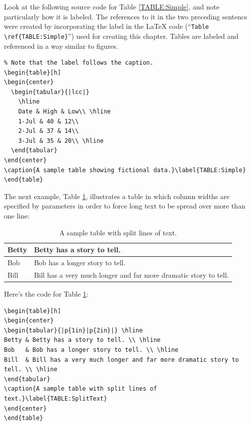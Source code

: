 {Look at the following source code for Table \ref{TABLE:Simple}, and note particularly how it is labeled.
The references to it in the two preceding sentencs were created by incorporating the label in the {\LaTeX} code 
(``\verb+Table \ref{TABLE:Simple}+'') used for creating this chapter.
Tables are labeled and referenced in a way similar to figures.

\begin{verbatim}
% Note that the label follows the caption.
\begin{table}[h]
\begin{center}
  \begin{tabular}{|lcc|}
    \hline
    Date & High & Low\\ \hline
    1-Jul & 40 & 12\\
    2-Jul & 37 & 14\\
    3-Jul & 35 & 20\\ \hline
  \end{tabular}
\end{center}
\caption{A sample table showing fictional data.}\label{TABLE:Simple}
\end{table}
\end{verbatim}

The next example, Table \ref{TABLE:SplitText}, illustrates a table in which column widths are specified by parameters in order to force long text to be spread over more than one line: 

\begin{table}[h]
\begin{center}
\begin{tabular}{|p{1in}|p{2in}|} \hline
Betty & Betty has a story to tell. \\ \hline
Bob   & Bob has a longer story to tell. \\ \hline
Bill  & Bill has a very much longer and far more dramatic story to tell. \\ \hline
\end{tabular}
\caption{A sample table with split lines of text.}\label{TABLE:SplitText}
\end{center}
\end{table}

\noindent Here's the code for Table \ref{TABLE:SplitText}:

\begin{verbatim}
\begin{table}[h]
\begin{center}
\begin{tabular}{|p{1in}|p{2in}|} \hline
Betty & Betty has a story to tell. \\ \hline
Bob   & Bob has a longer story to tell. \\ \hline
Bill  & Bill has a very much longer and far more dramatic story to tell. \\ \hline
\end{tabular}
\caption{A sample table with split lines of text.}\label{TABLE:SplitText}
\end{center}
\end{table}
\end{verbatim}

}
